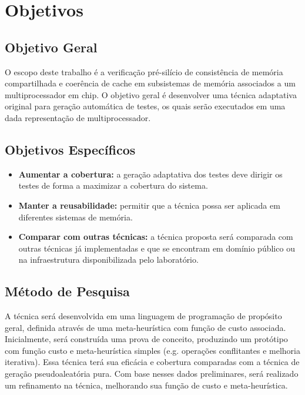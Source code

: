 \documentclass{ufsc-thesis} %
\begin{document}

\chapter{Objetivos}

\section{Objetivo Geral}
O escopo deste trabalho é a verificação pré-silício de consistência de memória compartilhada e
coerência de cache em subsistemas de memória associados a um multiprocessador em chip. O
objetivo geral é desenvolver uma técnica adaptativa original para geração automática de testes, os quais serão executados em uma dada representação de multiprocessador.

\section{Objetivos Específicos}
\begin{itemize}
	\item \textbf{Aumentar a cobertura:} a geração adaptativa dos testes deve dirigir os testes de forma a maximizar a cobertura do sistema.
	\item \textbf{Manter a reusabilidade:} permitir que a técnica possa ser aplicada em diferentes sistemas de memória.
	\item \textbf{Comparar com outras técnicas:} a técnica proposta será comparada com outras técnicas já implementadas e que se encontram em domínio público ou na infraestrutura disponibilizada pelo laboratório.
\end{itemize}

\section{Método de Pesquisa}

A técnica será desenvolvida em uma linguagem de programação de propósito geral, definida
através de uma meta-heurística com função de custo associada. Inicialmente, será construída uma
prova de conceito, produzindo um protótipo com função custo e meta-heurística simples (e.g.
operações conflitantes e melhoria iterativa). Essa técnica terá sua eficácia e cobertura
comparadas com a técnica de geração pseudoaleatória pura. Com base nesses dados preliminares,
será realizado um refinamento na técnica, melhorando sua função de custo e meta-heurística.
\end{document}
